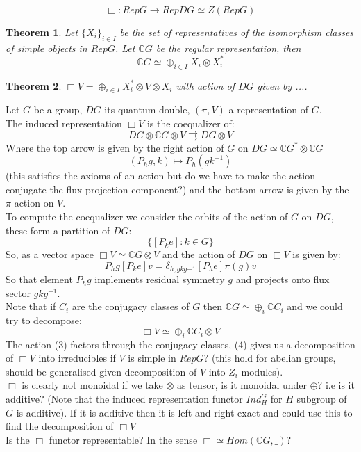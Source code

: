 \documentclass{article}
\newtheorem{theorem}{Theorem}[section]
\begin{document}
$$\Box: RepG \rightarrow RepDG\simeq Z(RepG)$$
\begin{theorem}
Let $\{X_i\}_{i\in I}$ be the set of representatives of the isomorphism classes of simple objects in $RepG$. Let $\mathbb{C}G$ be the regular representation, then $$\mathbb{C}G \simeq \oplus_{i\in I}X_i\otimes X_i^*$$
\end{theorem}
\begin{theorem}
$\Box V = \oplus_{i\in I}X_i^*\otimes V \otimes X_i$ with action of $DG$ given by ....
\end{theorem}
Let $G$ be a group, $DG$ its quantum double, $(\pi,V)$ a representation of $G$. \\
The induced representation $\Box V$ is the coequalizer of: \\
$$DG \otimes \mathbb{C}G \otimes V \rightrightarrows DG\otimes V$$ 
Where the top arrow is given by the right action of $G$ on $DG \simeq \mathbb{C}G^* \otimes \mathbb{C}G$ 
$$ (P_hg, k) \mapsto P_h (gk^{-1})$$
(this satisfies the axioms of an action but do we have to make the action conjugate the flux projection component?) and the bottom arrow is given by the $\pi$ action on $V$. \\
To compute the coequalizer we consider the orbits of the action of $G$ on $DG$, these form a partition of $DG$:
$$ \{[P_ke] : k \in G\} $$
So, as a vector space $\Box V \simeq \mathbb{C}G \otimes V$ and the action of $DG$ on $\Box V$ is given by:
\begin{equation}
P_hg [P_ke]v = \delta_{h,gkg{-1}} [P_he] \pi(g)v
\end{equation} 
So that element $P_hg$ implements residual symmetry $g$ and projects onto flux sector $gkg^{-1}$. \\
Note that if $C_i$ are the conjugacy classes of $G$ then $\mathbb{C}G \simeq \oplus_i \mathbb{C}C_i$ and we could try to decompose:
\begin{equation}
\Box V \simeq \oplus_i \mathbb{C}C_i \otimes V
\end{equation}
The action (3) factors through the conjugacy classes, (4) gives us a decomposition of $ \Box V$ into irreducibles if $V$ is simple in $RepG$? (this hold for abelian groups, should be generalised given decomposition of $V$ into $Z_i$ modules). \\
$\Box$ is clearly not monoidal if we take $\otimes$ as tensor, is it monoidal under $\oplus$? i.e is it additive? (Note that the induced representation functor $Ind_H^G$ for $H$ subgroup of $G$ is additive). If it is additive then it is left and right exact and could use this to find the decomposition of $ \Box V$ \\
Is the $\Box$ functor representable? In the sense $\Box \simeq Hom(\mathbb{C}G,\_)$?
\end{document}
